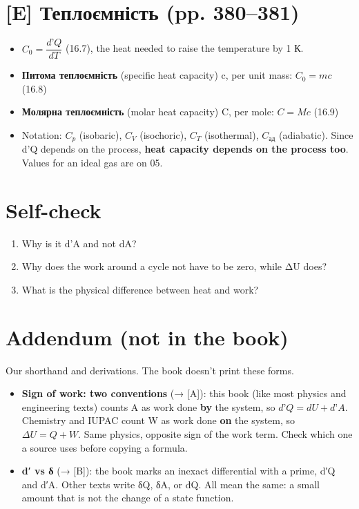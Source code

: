 \documentclass[11pt,a4paper,oneside]{book}
\begin{document}
\section*{[E] Теплоємність (pp. 380–381)}
\begin{itemize}
\item $C_0 = \dfrac{d\text{'}Q}{dT}$ (16.7), the heat needed to raise the temperature by 1 К.
\item \textbf{Питома теплоємність} (specific heat capacity) c, per unit mass: $C_0 = mc$ (16.8)
\item \textbf{Молярна теплоємність} (molar heat capacity) C, per mole: $C = Mc$ (16.9)
\item Notation: $C_{p}$ (isobaric), $C_{V}$ (isochoric), $C_{T}$ (isothermal), $C_{\text{ад}}$ (adiabatic). Since d'Q depends on the process, \textbf{heat capacity depends on the process too}. Values for an ideal gas are on 05.
\end{itemize}

\section*{Self-check}
\begin{enumerate}
\item Why is it d'A and not dA?
\item Why does the work around a cycle not have to be zero, while ΔU does?
\item What is the physical difference between heat and work?
\end{enumerate}

\section*{Addendum (not in the book)}
Our shorthand and derivations. The book doesn't print these forms.
\begin{itemize}
\item \textbf{Sign of work: two conventions} (→ [A]): this book (like most physics and engineering texts) counts A as work done \textbf{by} the system, so $d\text{'}Q = dU + d\text{'}A$. Chemistry and IUPAC count W as work done \textbf{on} the system, so $\Delta U = Q + W$. Same physics, opposite sign of the work term. Check which one a source uses before copying a formula.
\item \textbf{d′ vs δ} (→ [B]): the book marks an inexact differential with a prime, d′Q and d′A. Other texts write δQ, δA, or đQ. All mean the same: a small amount that is not the change of a state function.
\end{itemize}
\end{document}

